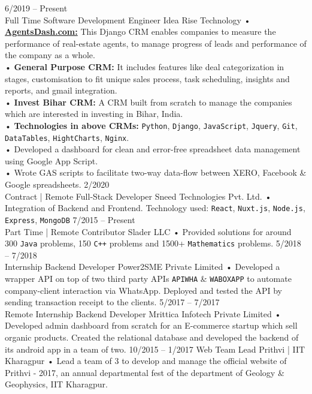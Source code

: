 \documentclass[8pt]{developercv} %
\begin{document}
\begin{entrylist}
	\entry
		{6/2019 -- Present\\\footnotesize{Full Time}}
		{Software Development Engineer}
		{Idea Rise Technology}
		{• \href{https://agentsdash.com}{\textbf{AgentsDash.com:}} This Django CRM enables companies to measure the performance of real-estate agents, to manage progress of leads and performance of the company as a whole. \\• \textbf{General Purpose CRM:} It includes features like deal categorization in stages, customisation to fit unique sales process, task scheduling, insights and reports, and gmail integration.\\• \textbf{Invest Bihar CRM:} A CRM built from scratch to manage the companies which are interested in investing in Bihar, India. \\• \textbf{Technologies in above CRMs:} \texttt{Python}, \texttt{Django}, \texttt{JavaScript}, \texttt{Jquery}, \texttt{Git}, \texttt{DataTables}, \texttt{HightCharts}, \texttt{Nginx}. \\ • Developed a dashboard for clean and error-free spreadsheet data management using Google App Script.\\ • Wrote GAS scripts to facilitate two-way data-flow between XERO, Facebook \& Google spreadsheets.}
	\entry
		{2/2020 \\\footnotesize{Contract | Remote}}
		{Full-Stack Developer}
		{Sneed Technologies Pvt. Ltd.}
		{• Integration of Backend and Frontend. Technology used: \texttt{React}, \texttt{Nuxt.js}, \texttt{Node.js}, \texttt{Express}, \texttt{MongoDB}}
	\entry
		{7/2015 -- Present\\\footnotesize{Part Time | Remote}}
		{Contributor}
		{Slader LLC}
		{• Provided solutions for around 300 \texttt{Java} problems, 150 \texttt{C++} problems and 1500+ \texttt{Mathematics} problems.}
	\entry
		{5/2018 -- 7/2018\\\footnotesize{Internship}}
		{Backend Developer}
		{Power2SME Private Limited}
		{• Developed a wrapper API on top of two third party APIs \texttt{APIWHA} \& \texttt{WABOXAPP} to automate company-client interaction via WhatsApp. Deployed and tested the API by sending transaction receipt to the clients.}
	\entry
		{5/2017 -- 7/2017\\\footnotesize{Remote Internship}}
		{Backend Developer}
		{Mrittica Infotech Private Limited}
		{• Developed admin dashboard from scratch for an E-commerce startup which sell organic products. Created the relational database and developed the backend of its android app in a team of two.}
	\entry
		{10/2015 -- 1/2017}
		{Web Team Lead}
		{Prithvi | IIT Kharagpur}
		{• Lead a team of 3 to develop and manage the official website of Prithvi - 2017, an annual departmental fest of the department of Geology \& Geophysics, IIT Kharagpur.}
\end{entrylist}
\end{document}

